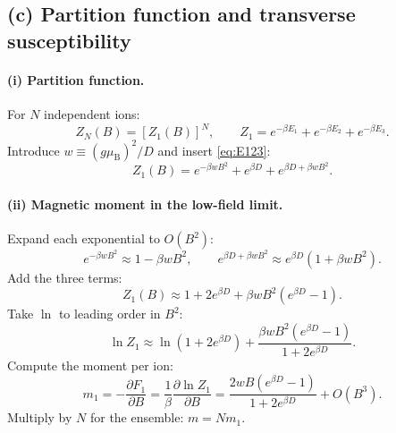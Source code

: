\documentclass[11pt]{article}
\newcommand{\pdone}[2]{\frac{\partial #1}{\partial #2}}
\begin{document}
\subsection*{(c) Partition function and transverse susceptibility}

\paragraph{(i) Partition function.} For $N$ independent ions:
\begin{equation}
Z_{N}(B)=[Z_{1}(B)]^{N},\qquad Z_{1}=e^{-\beta E_{1}}+e^{-\beta E_{2}}+e^{-\beta E_{3}}.
\label{eq:ZN}
\end{equation}
Introduce $w\equiv(g\mu_{\mathrm B})^{2}/D$ and insert \eqref{eq:E123}:
\begin{equation}
Z_{1}(B)=e^{-\beta w B^{2}}+e^{\beta D}+e^{\beta D+\beta w B^{2}}.
\label{eq:Z1}
\end{equation}

\paragraph{(ii) Magnetic moment in the low-field limit.} Expand each exponential to $O(B^{2})$:
\begin{equation}
e^{-\beta w B^{2}}\approx 1-\beta w B^{2},\qquad e^{\beta D+\beta w B^{2}}\approx e^{\beta D}(1+\beta w B^{2}).
\end{equation}
Add the three terms:
\begin{equation}
Z_{1}(B)\approx 1+2e^{\beta D}+\beta w B^{2}(e^{\beta D}-1).
\label{eq:Z1-expand}
\end{equation}
Take $\ln$ to leading order in $B^2$:
\begin{equation}
\ln Z_1\approx\ln(1+2e^{\beta D})+\frac{\beta w B^{2}(e^{\beta D}-1)}{1+2e^{\beta D}}.
\end{equation}
Compute the moment per ion:
\begin{equation}
m_{1}=-\pdone{F_{1}}{B}=\frac{1}{\beta}\pdone{\ln Z_{1}}{B}=\frac{2 w B(e^{\beta D}-1)}{1+2e^{\beta D}}+O(B^{3}).
\label{eq:m-ion}
\end{equation}
Multiply by $N$ for the ensemble: $m=Nm_1$.
\end{document}
